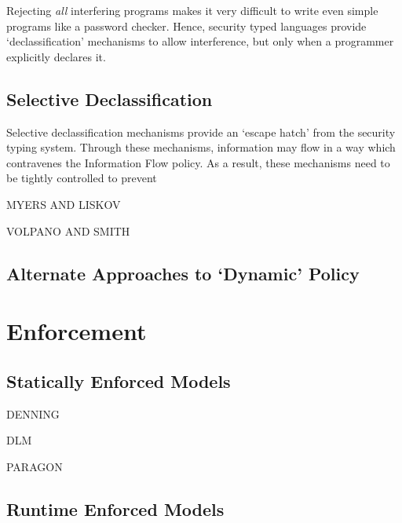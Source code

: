 Rejecting \textit{all} interfering programs makes it very difficult to write even simple programs like a password checker. Hence, security typed languages provide `declassification' mechanisms to allow interference, but only when a programmer explicitly declares it.

\subsection{Selective Declassification}

Selective declassification mechanisms provide an `escape hatch' from the security typing system. Through these mechanisms, information may flow in a way which contravenes the Information Flow policy. As a result, these mechanisms need to be tightly controlled to prevent

MYERS AND LISKOV

VOLPANO AND SMITH

\subsection{Alternate Approaches to `Dynamic' Policy}

\section{Enforcement}

\subsection{Statically Enforced Models}

DENNING

DLM

PARAGON

\subsection{Runtime Enforced Models}




%
%


